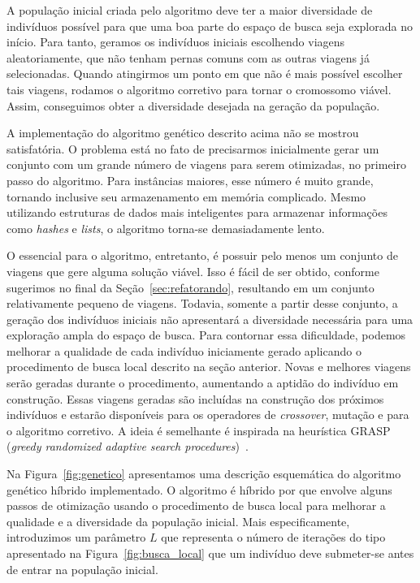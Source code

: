 A população inicial criada pelo algoritmo deve ter a maior diversidade de indivíduos possível para
que uma boa parte do espaço de busca seja explorada no início. Para tanto, geramos os indivíduos
iniciais escolhendo viagens aleatoriamente, que não tenham pernas comuns com as outras viagens já
selecionadas. Quando atingirmos um ponto em que não é mais possível escolher tais viagens, rodamos o
algoritmo corretivo para tornar o cromossomo viável. Assim, conseguimos obter a diversidade
desejada na geração da população.

A implementação do algoritmo genético descrito acima não se mostrou satisfatória. O problema está no
fato de precisarmos inicialmente gerar um conjunto com um grande número de viagens para serem
otimizadas, no primeiro passo do algoritmo. Para instâncias maiores, esse número é muito grande,
tornando inclusive seu armazenamento em memória complicado. Mesmo utilizando estruturas de dados
mais inteligentes para armazenar informações como {\it hashes} e {\it lists}, o algoritmo torna-se
demasiadamente lento.

O essencial para o algoritmo, entretanto, é possuir pelo menos um conjunto de viagens que gere
alguma solução viável. Isso é fácil de ser obtido, conforme sugerimos no final da
Seção~\ref{sec:refatorando}, resultando em um conjunto relativamente pequeno de viagens. Todavia,
somente a partir desse conjunto, a geração dos indivíduos iniciais não apresentará a diversidade
necessária para uma exploração ampla do espaço de busca. Para contornar essa dificuldade, podemos
melhorar a qualidade de cada indivíduo iniciamente gerado aplicando o procedimento de busca local
descrito na seção anterior. Novas e melhores viagens serão geradas durante o procedimento,
aumentando a aptidão do indivíduo em construção. Essas viagens geradas são incluídas na construção
dos próximos indivíduos e estarão disponíveis para os operadores de {\it crossover}, mutação e para
o algoritmo corretivo. A ideia é semelhante é inspirada na heurística GRASP ({\it greedy randomized
adaptive search procedures})~\cite{feo89, feo95}.

Na Figura~\ref{fig:genetico} apresentamos uma descrição esquemática do algoritmo genético híbrido
implementado. O algoritmo é híbrido por que envolve alguns passos de otimização usando o 
procedimento de busca local para melhorar a qualidade e a diversidade da população inicial. Mais
especificamente, introduzimos um parâmetro $L$ que representa o número de iterações do tipo
apresentado na Figura~\ref{fig:busca_local} que um indivíduo deve submeter-se antes de entrar na
população inicial.

